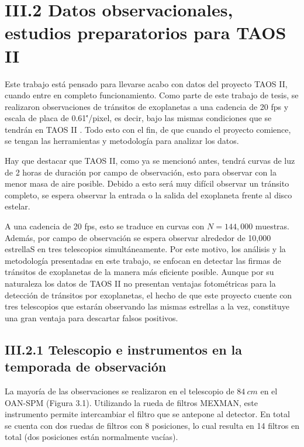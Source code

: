\section*{III.2 Datos observacionales, estudios preparatorios para TAOS II}

Este trabajo está pensado para llevarse acabo con datos del proyecto TAOS II, cuando entre en completo funcionamiento. Como parte de este trabajo de tesis, se realizaron observaciones de tránsitos de exoplanetas a una cadencia de 20 fps y escala de placa de 0.61\''/pixel, es decir, bajo las mismas condiciones que se tendrán en TAOS II \cite{lehner2012transneptunian}. Todo esto con el fin, de que cuando el proyecto comience, se tengan las herramientas y metodología para analizar los datos.

Hay que destacar que TAOS II, como ya se mencionó antes, tendrá curvas de luz de 2 horas de duraci\'on por campo de observación, esto para observar con la menor masa de aire posible. Debido a esto será muy difícil observar un tránsito completo, se espera observar la entrada o la salida del exoplaneta frente al disco estelar. 

A una cadencia de 20 fps, esto se traduce en curvas con $N=144,000$ muestras. Además, por campo de observación se espera observar alrededor de 10,000 estrellaS en tres telescopios simultáneamente. Por este motivo, los análisis y la metodología presentadas en este trabajo, se enfocan en detectar las firmas de tránsitos de exoplanetas de la manera más eficiente posible. Aunque por su naturaleza los datos de TAOS II no presentan ventajas fotométricas para la detección de tránsitos por exoplanetas, el hecho de que este proyecto cuente con tres telescopios que estarán observando las mismas estrellas a la vez, constituye una gran ventaja para descartar falsos positivos.

\subsection*{III.2.1 Telescopio e instrumentos en la temporada de observación}

La mayoría de las observaciones se realizaron en el telescopio de $84~cm$ en el OAN-SPM (Figura 3.1). Utilizando la rueda de filtros MEXMAN, este instrumento permite intercambiar el filtro que se antepone al detector. En total se cuenta con dos ruedas de filtros con 8 posiciones, lo cual resulta en 14 filtros en total (dos posiciones están normalmente vacías). 

